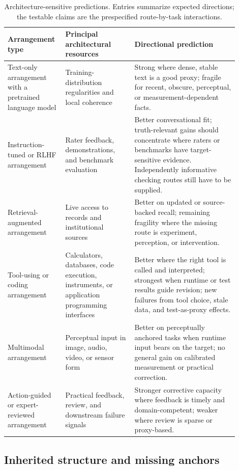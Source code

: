\documentclass[12pt]{article}
\begin{document}
\begin{table}[!t]
\centering
\small
\begin{tabular}{@{}>{\raggedright\arraybackslash}p{0.20\linewidth}>{\raggedright\arraybackslash}p{0.28\linewidth}>{\raggedright\arraybackslash}p{0.42\linewidth}@{}}
\toprule
Arrangement type & Principal architectural resources & Directional prediction \\
\midrule
Text-only arrangement with a pretrained language model & Training-distribution regularities and local coherence & Strong where dense,
stable text is a good proxy; fragile for recent, obscure, perceptual, or measurement-dependent facts. \\
Instruction-tuned or RLHF arrangement & Rater feedback, demonstrations, and benchmark evaluation & Better conversational fit; truth-relevant gains should concentrate where raters or benchmarks have target-sensitive evidence. Independently informative checking routes still have to be supplied. \\
Retrieval-augmented arrangement & Live access to records and institutional sources & Better on updated or source-backed recall; remaining fragility where the missing route is experiment, perception, or intervention. \\
Tool-using or coding arrangement & Calculators, databases, code execution, instruments, or application programming interfaces & Better where the right tool is called and interpreted; strongest when runtime or test results guide revision; new failures from tool choice, stale data, and test-as-proxy effects. \\
Multimodal arrangement & Perceptual input in image, audio, video, or sensor form & Better on perceptually anchored tasks when runtime input bears on the target; no general gain on calibrated measurement or practical correction. \\
Action-guided or expert-reviewed arrangement & Practical feedback, review, and downstream failure signals & Stronger corrective capacity where feedback is timely and domain-competent; weaker where review is sparse or proxy-based. \\
\bottomrule
\end{tabular}
\caption{Architecture-sensitive predictions. Entries summarize expected directions; the
testable claims are the prespecified route-by-task interactions.}
\label{tab:llm-profiles}
\end{table}

\subsection{Inherited structure and missing anchors}\label{ssec:inheritance}
\end{document}
